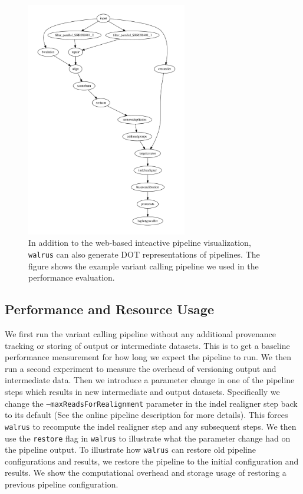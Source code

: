 \begin{figure}
    \centering
\includegraphics[width=7cm]{figures/graph.pdf}
    \caption{In addition to the web-based inteactive pipeline visualization,
    \texttt{walrus} can also generate DOT representations of pipelines. The
    figure shows the example variant calling pipeline we used in the performance
    evaluation.} 
    \label{benchpipefigure}
\end{figure} 

\subsection{Performance and Resource Usage}
We first run the variant calling pipeline without any additional provenance
tracking or storing of output or intermediate datasets. This is to get a
baseline performance measurement for how long we expect the pipeline to run. We
then run a second experiment to measure the overhead of versioning output and
intermediate data. Then we introduce a parameter change in one of the pipeline
steps which results in new intermediate and output datasets. Specifically we
change the \texttt{--maxReadsForRealignment} parameter in the indel realigner
step back to its default (See the online pipeline description for more details).
This forces \texttt{walrus} to recompute the indel realigner step and any
subsequent steps. We then use the \texttt{restore} flag in \texttt{walrus} to
illustrate what the parameter change had on the pipeline output. To illustrate
how \texttt{walrus} can restore old pipeline configurations and results, we
restore the pipeline to the initial configuration and results. We show the
computational overhead and storage usage of restoring a previous pipeline
configuration. 

